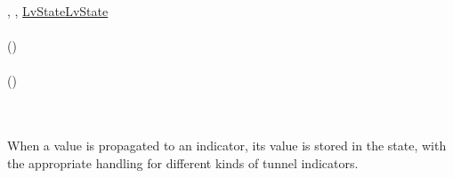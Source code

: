 \begin{hscode}\SaveRestoreHook
{}%
%
%
%
%
\>[B]{}\mathbin{::}\to {}\to \llparenthesis \cdot , \cdot , \cdot \rrparenthesis \to \hyperlink{LvState}{LvState}\to \hyperlink{LvState}{LvState}{}\<[E]%
\\
\>[B]{}\;\;\;\;\mathrel{=}{}\<[E]%
\\
\>[B]{}\<[4]%
\>[4]{}\;\;\;(\;){}\<[E]%
\\
\>[4]{}\<[7]%
\>[7]{}\<[E]%
\\
\>[4]{}\<[7]%
\>[7]{}\;\;(\;\;)\mathrel{=}{}\<[E]%
\\
\>[7]{}\<[10]%
\>[10]{}\;\equiv {}\<[E]%
\\
\>[7]{}\<[10]%
\>[10]{}\;\;\;\;\;\<[E]%
\\
\>[7]{}\<[10]%
\>[10]{}\;\<[E]%
\ColumnHook
\end{hscode}\resethooks

When a value is propagated to an indicator, its value is stored in the
state, with the appropriate handling for different kinds of tunnel
indicators.


